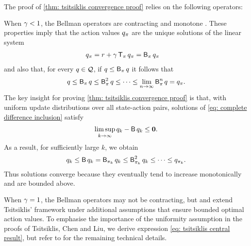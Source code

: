 \vspace{-0.7cm}

The proof of \autoref{thm: tsitsiklis convergence proof} relies on the following operators:

\vspace{-0.1cm}



When $\gamma<1$, the Bellman operators are contracting and monotone \citep[Example 1.2.1]{Bertsekas2018AbstractProgramming}. These properties imply that the action values $q_\pi$ 
are the unique solutions of the linear system
\begin{align}
\label{eq: linear system with operators}
    q_\pi &= r + \gamma \operatorname{\mathsf{T}}_{\pi} q_\pi = \operatorname{\mathsf{B}}_{\pi} q_\pi
\end{align}
and also that, for every $q \in \mathcal{Q}$, if $q \leq \operatorname{\mathsf{B}}_{\pi} q$
it follows that
\begin{align*}
    q \leq \operatorname{\mathsf{B}}_{\pi} q \leq \operatorname{\mathsf{B}}_{\pi}^2 q \leq \dots \leq \lim_{n \to \infty} \operatorname{\mathsf{B}}_{\pi}^n q = q_\pi .
\end{align*}
% 
% 
The key insight for proving \autoref{thm: tsitsiklis convergence proof} is that, with uniform update distributions over all state-action pairs, solutions of \eqref{eq: complete difference inclusion} satisfy
\begin{align}
\label{eq: tsitsiklis central result}
    \limsup_{k \to \infty} q_k - \operatorname{\mathsf{B}} q_k \leq \mathbf{0} .
\end{align}
As a result, for sufficiently large $k$, we obtain 
\begin{align*}
    q_k \leq \operatorname{\mathsf{B}} q_k = \operatorname{\mathsf{B}}_{\pi_k} q_k \leq \operatorname{\mathsf{B}}_{\pi_k}^2 q_k \leq \dots \leq q_{\pi_k} .
\end{align*}
Thus solutions converge because they eventually tend to increase monotonically and are bounded above.

When $\gamma = 1$, the Bellman operators may not be contracting, but \cite{Chen2018OnProblem} and \cite{Liu2021OnStarts} extend Tsitsiklis' framework under additional assumptions that ensure bounded optimal action values.
% 
To emphasise the importance of the uniformity assumption in the proofs of Tsitsiklis, Chen and Liu, we derive expression \eqref{eq: tsitsiklis central result}, but refer to \citep[p.~63-66]{Tsitsiklis2002OnIteration} for the remaining technical details.

